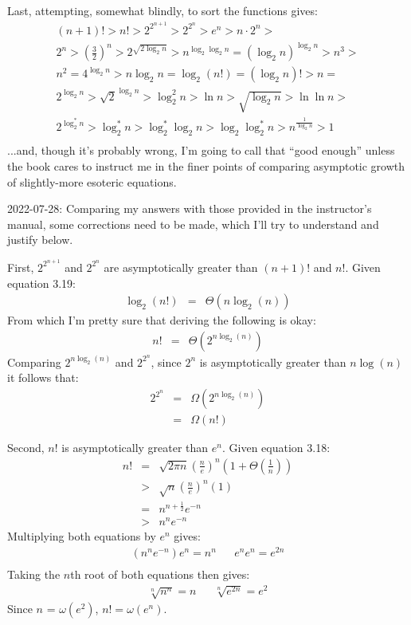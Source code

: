 Last, attempting, somewhat blindly, to sort the functions gives:
\begin{multline}
	(n+1)! > n! > 2^{2^{n+1}} > 2^{2^n} > e^n > n \cdot 2^n > \\
	2^n > \left(\frac{3}{2}\right)^n > 2^{\sqrt{2 \log_2 n}} > n^{\log_2 \log_2 n} = \left(\log_2 n\right)^{\log_2 n} > n^3 > \\
	n^2 = 4^{\log_2 n} > n \log_2 n = \log_2 (n!) = \left(\log_2 n\right)! > n = \\
	2^{\log_2 n} > \sqrt{2}^{\log_2 n} > \log^2_2 n > \ln n > \sqrt{\log_2 n} > \ln \ln n > \\
	2^{\log^*_2 n} > \log^*_2 n > \log^*_2 \log_2 n > \log_2 \log^*_2 n > n^{\frac{1}{\log_2 n}} > 1 \\
\end{multline}
...and, though it's probably wrong, I'm going to call that ``good enough'' unless the book cares to instruct me in the finer points of comparing asymptotic growth of slightly-more esoteric equations.

2022-07-28: Comparing my answers with those provided in the instructor's manual, some corrections need to be made, which I'll try to understand and justify below.

First, $2^{2^{n+1}}$ and $2^{2^n}$ are asymptotically greater than $(n+1)!$ and $n!$.  Given equation 3.19:
\begin{eqnarray*}
	\log_2(n!) & = & \Theta(n \log_2(n))
\end{eqnarray*}
From which I'm pretty sure that deriving the following is okay:
\begin{eqnarray*}
	n! & = & \Theta(2^{n \log_2(n)})
\end{eqnarray*}
Comparing $2^{n \log_2(n)}$ and $2^{2^n}$, since $2^n$ is asymptotically greater than $n\log(n)$ it follows that:
\begin{eqnarray*}
	2^{2^n} & = & \Omega(2^{n \log_2 (n)}) \\
	& = & \Omega(n!)
\end{eqnarray*}

Second, $n!$ is asymptotically greater than $e^n$.  Given equation 3.18:
\begin{eqnarray*}
	n! & = & \sqrt{2 \pi n} \left ( \frac{n}{e} \right )^n \left ( 1 + \Theta \left ( \frac{1}{n} \right ) \right ) \\
	 & > & \sqrt{n} \left ( \frac{n}{e} \right )^n ( 1 ) \\
	 & = & n^{n+\frac{1}{2}} e^{-n} \\
	 & > & n^n e^{-n}
\end{eqnarray*}
Multiplying both equations by $e^n$ gives:
\begin{eqnarray*}
	(n^n e^{-n}) e^n = n^n & & e^n e^n = e^{2n} \\
\end{eqnarray*}
Taking the $n$th root of both equations then gives:
\begin{eqnarray*}
	\sqrt[n]{n^n} = n & & \sqrt[n]{e^{2n}} = e^2
\end{eqnarray*}
Since $n$ = $\omega ( e^2 )$, $n! = \omega ( e^n )$.

